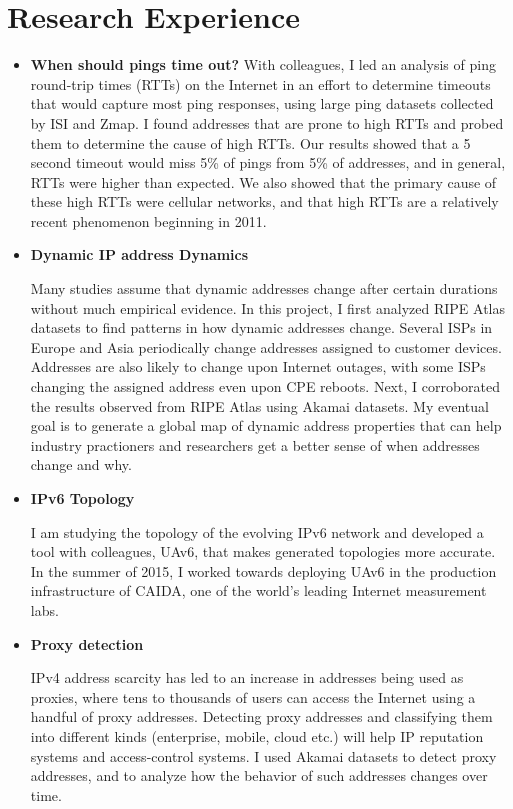 \section*{Research Experience}
\label{sec:research-experience}
\begin{itemize}

\item{\bf{When should pings time out?}} 
With colleagues, I led an analysis of ping round-trip times (RTTs) on the Internet in an effort to
determine
timeouts that would capture most ping responses, using large ping datasets
collected by ISI and Zmap. I
found addresses that are prone to high RTTs and probed them to determine the cause of high RTTs.
Our results showed that a 5 second timeout would miss 5\% of pings from 5\% of
addresses, and in general, RTTs were higher than expected. We also showed that the primary cause of these high RTTs were cellular
networks, and that high RTTs are a relatively recent phenomenon
beginning in 2011.

\item{\bf{Dynamic IP address Dynamics}}

  Many studies assume that dynamic addresses change after
  certain durations without much empirical evidence. In this project,
  I first analyzed RIPE Atlas datasets to find patterns in how
  dynamic addresses change. Several ISPs in Europe and Asia
  periodically change addresses assigned to customer
  devices. Addresses are also likely to change upon Internet outages,
  with some ISPs changing the assigned address even upon CPE
  reboots. Next, I corroborated the results observed from RIPE Atlas
  using Akamai datasets. My eventual goal is to generate a global map of
  dynamic address properties that can help industry practioners and researchers get a better
  sense of when addresses change and why.

\item{\bf{IPv6 Topology}}

I am studying the
  topology of the evolving IPv6 network and developed a tool with colleagues,
  UAv6, that makes generated topologies more accurate. In the summer
  of 2015, I worked towards deploying UAv6 in the production infrastructure of CAIDA,
  one of the world's leading Internet measurement labs.

\item{\bf{Proxy detection}}

  IPv4 address scarcity has led to an increase in addresses being used
  as proxies, where tens to thousands of users can access the
  Internet using a handful of proxy addresses. Detecting proxy
  addresses and
  classifying them into different kinds
  (enterprise, mobile, cloud etc.) will help IP reputation systems and
  access-control systems. I used Akamai datasets to detect proxy
  addresses, and to analyze how the behavior of such addresses
  changes over time.


\end{itemize}
